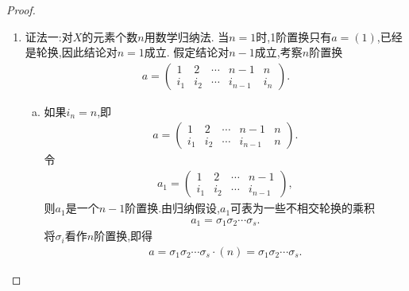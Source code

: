 \documentclass[../../main.tex]{subfiles}%
\begin{document}
\begin{proof}
\begin{enumerate}[(1)]
\item {\color{blue}证法一:}对$X$的元素个数$n$用数学归纳法.
当$n=1$时,1阶置换只有$a=(1)$,已经是轮换,因此结论对$n=1$成立.
假定结论对$n-1$成立,考察$n$阶置换
\begin{align*}
a = \begin{pmatrix} 1 & 2 & \cdots & n-1 & n \\ i_1 & i_2 & \cdots & i_{n-1} & i_n \end{pmatrix}.
\end{align*}

\begin{enumerate}[(a)]
\item 如果$i_n = n$,即
\begin{align*}
a = \begin{pmatrix} 1 & 2 & \cdots & n-1 & n \\ i_1 & i_2 & \cdots & i_{n-1} & n \end{pmatrix}.
\end{align*}
令
\begin{align*}
a_1 = \begin{pmatrix} 1 & 2 & \cdots & n-1 \\ i_1 & i_2 & \cdots & i_{n-1} \end{pmatrix},
\end{align*}
则$a_1$是一个$n-1$阶置换.由归纳假设,$a_1$可表为一些不相交轮换的乘积
\begin{align*}
a_1 = \sigma_1\sigma_2\cdots\sigma_s.
\end{align*}
将$\sigma_i$看作$n$阶置换,即得
\begin{align*}
a = \sigma_1\sigma_2\cdots\sigma_s \cdot (n) = \sigma_1\sigma_2\cdots\sigma_s.
\end{align*}


\end{enumerate}
\end{enumerate}
\end{proof}
\end{document}
